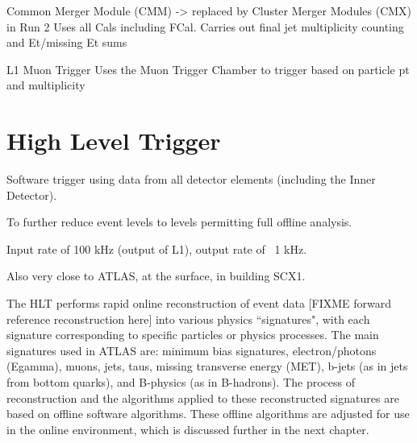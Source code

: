     Common Merger Module (CMM) -> replaced by Cluster Merger Modules (CMX) in Run 2 \cite{trigger_run2}
        Uses all Cals including FCal.
        Carries out final jet multiplicity counting and Et/missing Et sums

L1 Muon Trigger \cite{trigger_run1}
    Uses the Muon Trigger Chamber %
    to trigger based on particle pt and multiplicity



\section{High Level Trigger}

Software trigger using data from all detector elements (including the Inner Detector).

To further reduce event levels to levels permitting full offline analysis.

Input rate of 100 kHz (output of L1), output rate of ~1 kHz.

Also very close to ATLAS, at the surface, in building SCX1. %

The HLT performs rapid online reconstruction of event data [FIXME forward reference reconstruction here] into various physics ``signatures", with each signature corresponding to specific particles or physics processes.
The main signatures used in ATLAS are: minimum bias signatures, electron/photons (Egamma), muons, jets, taus, missing transverse energy (MET), b-jets (as in jets from bottom quarks), and B-physics (as in B-hadrons).
The process of reconstruction and the algorithms applied to these reconstructed signatures are based on offline software algorithms.
These offline algorithms are adjusted for use in the online environment, which is discussed further in the next chapter.
    



